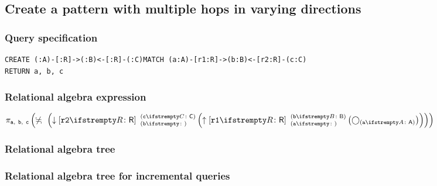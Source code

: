 \subsection{Create a pattern with multiple hops in varying directions}

\subsubsection*{Query specification}

\begin{lstlisting}
CREATE (:A)-[:R]->(:B)<-[:R]-(:C)MATCH (a:A)-[r1:R]->(b:B)<-[r2:R]-(c:C)
RETURN a, b, c
\end{lstlisting}

\subsubsection*{Relational algebra expression}

$\projection{\var{a},~\var{b},~\var{c}} \left(\alldifferent{} \left(\expandin{r2}{R}{b}{c}{C} \left(\expandout{r1}{R}{a}{b}{B} \left(\getvertices{a}{A}\right)\right)\right)\right)$

\subsubsection*{Relational algebra tree}


\subsubsection*{Relational algebra tree for incremental queries}


